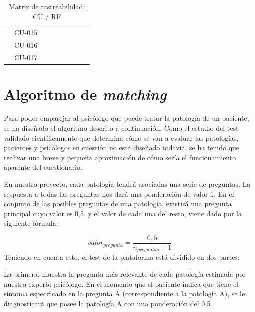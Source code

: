 \begin{table}[htpb]
\begin{tabularx}{\textwidth}{|l|X|X|X|X|X|X|X|X|}
                         & CU-015       &        &        &        &        &        &        &        \\ \cline{2-9} 
                         & CU-016       &        &        &        &        &        &        &        \\ \cline{2-9}
                         & CU-017       &        &        &        &        &        &        &        \\ \hline
\end{tabularx}
\caption{Matriz de rastreabilidad: CU / RF}
\label{mat_rast_cu_rf}
\end{table}


\section{Algoritmo de \textit{matching}}


Para poder emparejar al psicólogo que puede tratar la patología de un paciente, se ha diseñado el algoritmo descrito a continuación. Como el estudio del test validado científicamente que determina cómo se van a evaluar las patologías, pacientes y psicólogos en cuestión no está diseñado todavía, se ha tenido que realizar una breve y pequeña aproximación de cómo sería el funcionamiento aparente del cuestionario.


En nuestro proyecto, cada patología tendrá asociadas una serie de preguntas. La respuesta a todas las preguntas nos dará una ponderación de valor 1. En el conjunto de las posibles preguntas de una patología, existirá una pregunta principal cuyo valor es 0,5, y el valor de cada una del resto, viene dado por la siguiente fórmula:

\begin{equation}
valor_{pregunta} = \frac{0,5}{n_{preguntas}-1}
\label{mi_ecuacion}
\end{equation}
%
%
%
%
Teniendo en cuenta esto, el test de la plataforma está dividido en dos partes:


La primera, muestra la pregunta más relevante de cada patología estimada por nuestro experto psicólogo. En el momento que el paciente indica que tiene el síntoma especificado en la pregunta A (correspondiente a la patología A), se le diagnosticará que posee la patología A con una ponderación del 0,5.


